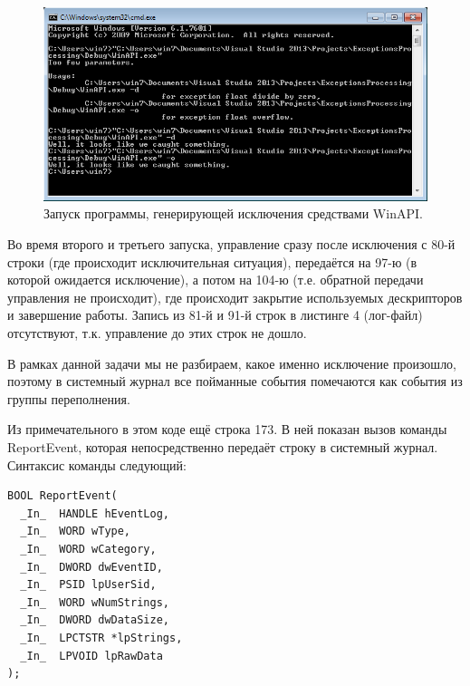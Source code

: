 \documentclass[a4paper, 12pt]{report}		%
\begin{document}
\begin{figure}[h!]
\centering
\includegraphics[scale=0.95]{res/001}
\caption{Запуск программы, генерирующей исключения средствами WinAPI.}
\end{figure}

Во время второго и третьего запуска, управление сразу после исключения с 80-й строки (где происходит исключительная ситуация),  передаётся на 97-ю (в которой ожидается исключение), а потом на 104-ю (т.е. обратной передачи управления не происходит), где происходит закрытие используемых дескрипторов и завершение работы. Запись из 81-й и 91-й строк в листинге 4 (лог-файл) отсутствуют, т.к. управление до этих строк не дошло.

В рамках данной задачи мы не разбираем, какое именно исключение произошло, поэтому в системный журнал все пойманные события помечаются как события из группы переполнения.



Из примечательного в этом коде ещё строка 173. В ней показан вызов команды ReportEvent\cite{MSDN2}, которая непосредственно передаёт строку в системный журнал. Синтаксис команды следующий:

\begin{verbatim}
BOOL ReportEvent(
  _In_  HANDLE hEventLog,
  _In_  WORD wType,
  _In_  WORD wCategory,
  _In_  DWORD dwEventID,
  _In_  PSID lpUserSid,
  _In_  WORD wNumStrings,
  _In_  DWORD dwDataSize,
  _In_  LPCTSTR *lpStrings,
  _In_  LPVOID lpRawData
);
\end{verbatim}
\end{document}
